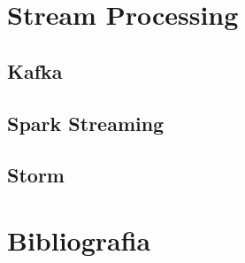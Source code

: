 \documentclass[italian,a4paper, twoside, 12pt]{report}
\begin{document}
\chapter{Stream Processing}\label{stream-processing}

\section{Kafka}\label{kafka}

\section{Spark Streaming}\label{spark-streaming}

\section{Storm}\label{storm}

\chapter{Bibliografia}\label{bibliografia}
\end{document}
